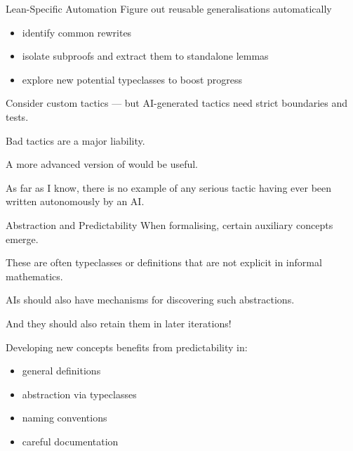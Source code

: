 \documentclass{beamer}
\newcommand{\cverb}[1]{{\color{purple}{\texttt{#1}}}}
\begin{document}
\begin{frame}{Lean-Specific Automation}
Figure out reusable generalisations automatically
\begin{itemize}
  \item identify common rewrites
  \medskip
  \item isolate subproofs and extract them to standalone lemmas
  \medskip
  \item explore new potential typeclasses to boost progress
\end{itemize}

\bigskip

Consider custom tactics — but AI-generated tactics need strict boundaries and tests.

\bigskip

Bad tactics are a major liability.

\bigskip

A more advanced version of \cverb{group} would be useful.

\bigskip

As far as I know, there is no example of any serious tactic having ever been written autonomously by an AI.
\end{frame}

\begin{frame}{Abstraction and Predictability}
When formalising, certain auxiliary concepts emerge.

\bigskip

These are often typeclasses or definitions that are not explicit in informal mathematics.

\bigskip

AIs should also have mechanisms for discovering such abstractions.

\bigskip

And they should also retain them in later iterations!

\bigskip

Developing new concepts benefits from predictability in:

\smallskip

\begin{itemize}
  \item general definitions
  \smallskip
  \item abstraction via typeclasses
  \smallskip
  \item naming conventions
  \smallskip
  \item careful documentation
\end{itemize}
\end{frame}
\end{document}
